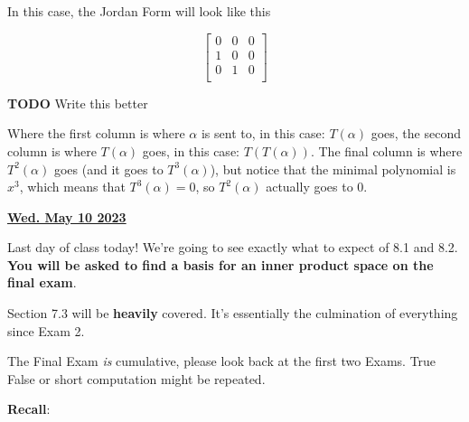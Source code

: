 \documentclass[12pt]{article}
\renewcommand{\date}[1]{\underline{\bf #1}}
\newcommand{\TODO}{\color{red}\textbf{TODO}\color{black}}
\begin{document}
{    In this case, the Jordan Form will look like this

    \[
      \begin{bmatrix}
        0 & 0 & 0 \\
        1 & 0 & 0 \\
        0 & 1 & 0 \\
      \end{bmatrix}
    \]

    \TODO{} Write this better

    Where the first column is where $\alpha$ is sent to, in this case:
    $T(\alpha)$ goes, the second column is where $T(\alpha)$ goes, in this case:
    $T(T(\alpha))$. The final column is where $T^2(\alpha)$ goes (and it goes to
    $T^3(\alpha)$), but notice that the minimal polynomial is $x^3$, which means
    that $T^3(\alpha) = 0$, so $T^2(\alpha)$ actually goes to $0$.
  }

  \date{Wed. May 10 2023}

  Last day of class today! We're going to see exactly what to expect of 8.1 and
  8.2. {\bf You will be asked to find a basis for an inner product space on the
  final exam}.

  Section 7.3 will be {\bf heavily} covered. It's essentially the culmination of
  everything since Exam 2.

  The Final Exam {\it is} cumulative, please look back at the first two Exams.
  True False or short computation might be repeated.

  {\bf Recall}:
\end{document}
